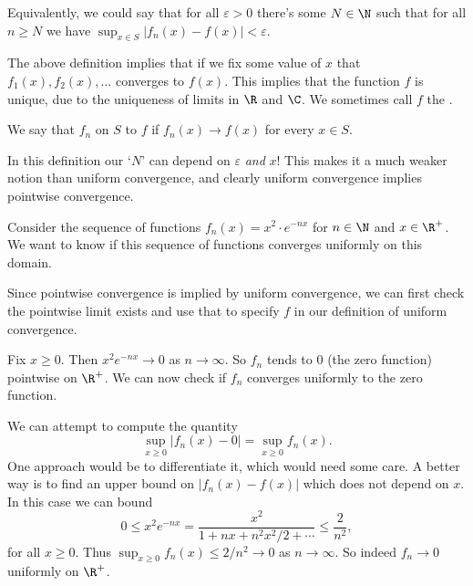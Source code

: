 \begin{center}
    

\end{center}


Equivalently, we could say that for all $\varepsilon > 0$ there's some $N \in \N$ such that for all $n \geq N$ we have $\sup_{x \in S} |f_n(x) - f(x)| < \varepsilon$.

The above definition implies that if we fix some value of $x$ that $f_1(x), f_2(x), \dots$ converges to $f(x)$. This implies that the function $f$ is unique, due to the uniqueness of limits in $\R$ and $\C$. We sometimes call $f$ the .

\begin{definition}
We say that $f_n$  on $S$ to $f$ if $f_n(x) \rightarrow f(x)$ for every $x \in S$.
\end{definition}
\begin{remark}
    In this definition our `$N$' can depend on $\varepsilon$ \emph{and} $x$! This makes it a much weaker notion than uniform convergence, and clearly uniform convergence implies pointwise convergence.
\end{remark}

\begin{example}
    Consider the sequence of functions $f_n(x) = x^2 \cdot e^{-n x}$ for $n \in \N$ and $x \in \R^+$. We want to know if this sequence of functions converges uniformly on this domain.

    Since pointwise convergence is implied by uniform convergence, we can first check the pointwise limit exists and use that to specify $f$ in our definition of uniform convergence.

    Fix $x \geq 0$. Then $x^2 e^{-nx} \rightarrow 0$ as $n \rightarrow \infty$. So $f_n$ tends to $0$ (the zero function) pointwise on $\R^+$. We can now check if $f_n$ converges uniformly to the zero function.

    We can attempt to compute the quantity
    $$
    \sup_{x \geq 0} |f_n(x) - 0| =  \sup_{x \geq 0} f_n(x).
    $$
    One approach would be to differentiate it, which would need some care. A better way is to find an upper bound on $|f_n(x) - f(x)|$ which does not depend on $x$. In this case we can bound
    $$
    0 \leq x^2 e^{-nx} = \frac{x^2}{1 + nx + n^2x^2/2 + \cdots} \leq \frac{2}{n^2},
    $$
    for all $x \geq 0$. Thus $\sup_{x \geq 0} f_n(x) \leq 2/n^2 \rightarrow 0$ as $n \rightarrow \infty$. So indeed $f_n \rightarrow 0$ uniformly on $\R^+$.
\end{example}

